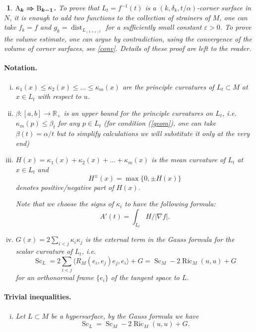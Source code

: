 \documentclass{article}
\def\RR{\mathbb{R}}
\def\eps{\varepsilon}
\def\le{\leqslant}
\def\i{\subset}
\def\<{\langle}
\def\>{\rangle}
\def\dist{\operatorname{dist}}
\def\Ric{\operatorname{Ric}}
\def\Sc{\operatorname{Sc}}
\newtheorem{Nothing}[thm]{$\!\!\!$}
\newenvironment{nothing}{\begin{Nothing}\rm}{\end{Nothing}}
\begin{document}
\begin{nothing}{\bf$\boldmath{\text{A}_{k}\Rightarrow\text{B}_{k-1}}$.}
To prove that $L_t=f^{-1}(t)$ is a $(k,\delta_{k},t/\alpha)$-corner surface in $N$,
it is enough to add two functions to the collection of strainers of $M$,
one can take $f_k=f$ and $g_k=\dist_{L_{(1+\eps)t}}$ for a sufficiently
small constant $\eps>0$.
To prove the volume estimate, one can argue by contradiction,
using the convergence of the volume of corner surfaces, see \ref{conv}.
Details of these proof are left to the reader.



\paragraph*{Notation.}
\begin{enumerate}[(i)]
\item $\kappa_1(x)\le \kappa_2(x)\le...\le \kappa_m(x)$ are the principle curvatures
of $L_t\i M$ at $x\in L_t$ with respect to $u$.
\item $\beta:[a,b]\to \RR_+$ is an upper bound for the principle curvatures on $L_t$,
i.e. $\kappa_m(p)\le \beta_t$ for any $p\in L_t$ (for condition (\ref{geom}), one can take $\beta(t)= \alpha/t$ but to simplify calculations we will substitute it only at the very end)
\item $H(x)=\kappa_1(x)+ \kappa_2(x)+...+ \kappa_m(x)$ is the mean curvature of
$L_{t}$ at $x\in L_{t}$ and $$H^\pm(x)=\max\{0,\pm H(x)\}$$
denotes positive/negative part of $H(x)$.

Note that we choose the signs of $\kappa_i$ to have the following formula:
$$A'(t)=\int_{L_t}H/|\nabla f|.$$
\item $G(x)=2\sum_{i<j}\kappa_i\kappa_j$ is the external term in the Gauss formula
for the scalar curvature of $L_t$, i.e.
$$\Sc_{L}=2\sum_{i<j}\<R_M(e_i,e_j)e_j,e_i\>+G=\Sc_M-2\Ric_M(u,u)+G$$
for an orthonormal frame $\{e_i\}$ of the tangent space to $L$.
\end{enumerate}

\paragraph*{Trivial inequalities.}
\begin{enumerate}[(i)]
\item\label{gauss1} Let $L\i M$ be a hypersurface, by the Gauss formula we have
$$
\Sc_{L}
=
\Sc_{M}-2\Ric_{M}(u,u)+G.
$$


\end{enumerate}
\end{nothing}
\end{document}
